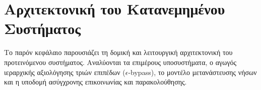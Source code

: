 
\chapter{Αρχιτεκτονική του Κατανεμημένου Συστήματος}
\label{ch:architecture}

Το παρόν κεφάλαιο παρουσιάζει τη δομική και λειτουργική αρχιτεκτονική του προτεινόμενου συστήματος. Αναλύονται τα επιμέρους υποσυστήματα, ο αγωγός ιεραρχικής αξιολόγησης τριών επιπέδων ($\epsilon$-bypass), το μοντέλο μετανάστευσης νήσων και η υποδομή ασύγχρονης επικοινωνίας και παρακολούθησης.
